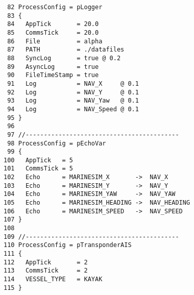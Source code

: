 \begin{verbatim}
 82 ProcessConfig = pLogger
 83 {
 84   AppTick       = 20.0
 85   CommsTick     = 20.0
 86   File          = alpha
 87   PATH          = ./datafiles
 88   SyncLog       = true @ 0.2
 89   AsyncLog      = true
 90   FileTimeStamp = true
 91   Log           = NAV_X     @ 0.1
 92   Log           = NAV_Y     @ 0.1
 93   Log           = NAV_Yaw   @ 0.1
 94   Log           = NAV_Speed @ 0.1
 95 }
 96    
 97 //------------------------------------------
 98 ProcessConfig = pEchoVar
 99 {
100   AppTick   = 5
101   CommsTick = 5
102   Echo      = MARINESIM_X       ->  NAV_X
103   Echo      = MARINESIM_Y       ->  NAV_Y
104   Echo      = MARINESIM_YAW     ->  NAV_YAW
105   Echo      = MARINESIM_HEADING ->  NAV_HEADING
106   Echo      = MARINESIM_SPEED   ->  NAV_SPEED
107 }
108     
109 //------------------------------------------
110 ProcessConfig = pTransponderAIS
111 {
112   AppTick       = 2
113   CommsTick     = 2
114   VESSEL_TYPE   = KAYAK
115 }
\end{verbatim}
\normalsize

